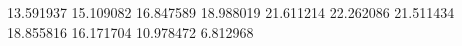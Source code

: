 13.591937
15.109082
16.847589
18.988019
21.611214
22.262086
21.511434
18.855816
16.171704
10.978472
6.812968
